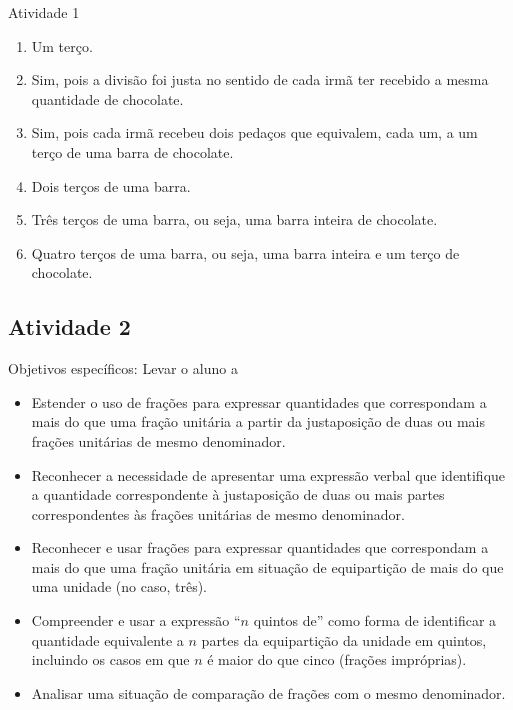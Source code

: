 \documentclass[oneside]{book}
\begin{document}
\begin{multicols}{2}
\begin{resposta*}{Atividade 1}
\begin{enumerate} [\quad a)] %
    \item       Um terço.
    \item       Sim, pois a divisão foi justa no sentido de cada irmã ter recebido a mesma quantidade de chocolate.
    \item       Sim, pois cada irmã recebeu dois pedaços que equivalem, cada um, a um terço de uma barra de chocolate.
    \item       Dois terços de uma barra.
    \item       Três terços de uma barra, ou seja, uma barra inteira de chocolate.
    \item       Quatro terços de uma barra, ou seja, uma barra inteira e um terço de chocolate.
\end{enumerate} %

\end{resposta*}


\subsection{Atividade 2}




  Objetivos específicos: Levar o aluno a
\begin{itemize} %
    \item       Estender o uso de frações para expressar quantidades que correspondam a mais do que uma fração unitária  a partir da justaposição de duas ou mais frações unitárias de mesmo denominador.
    \item       Reconhecer a necessidade de apresentar uma expressão verbal que identifique a quantidade correspondente à justaposição de duas ou mais partes correspondentes às frações unitárias de mesmo denominador.
    \item       Reconhecer e usar frações para expressar quantidades que correspondam a mais do que uma fração unitária em situação de equipartição de mais do que uma unidade (no caso, três).
    \item       Compreender e usar a expressão       ``$n$ quintos de''       como forma de identificar a quantidade equivalente a       $n$       partes da equipartição da unidade em quintos, incluindo os casos em que       $n$       é maior do que cinco (frações impróprias).
    \item       Analisar uma situação de comparação de frações com o mesmo denominador.
\end{itemize} %



\end{multicols}
\end{document}
